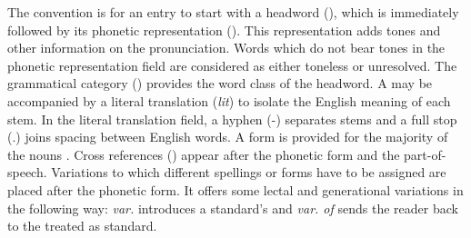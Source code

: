 \begin{table}
\caption[]{Illustrations of dictionary entries\label{tab:illu-dict}}
 \begin{center}
\end{center}
\end{table}

The convention is for an entry to start with a  headword (), which is immediately followed by its phonetic representation (). This representation adds tones and other information on the pronunciation. Words which do not bear tones in the phonetic representation field are considered as either toneless or  unresolved. The grammatical category () provides  the word class of the headword. A  may be accompanied by a literal translation ({\it lit})  to isolate the English meaning of each stem.  In the literal translation field, a hyphen (-) separates stems and a full stop (.) joins spacing between English words. A  form  is provided for the majority of the nouns . Cross references  () appear after  the phonetic form and the part-of-speech. Variations to which different spellings or forms have to be assigned are placed after the phonetic form. It offers some lectal and generational variations in the following way: {\it var.} introduces a standard's  and  {\it var. of} sends the reader back to the  treated as standard. 


